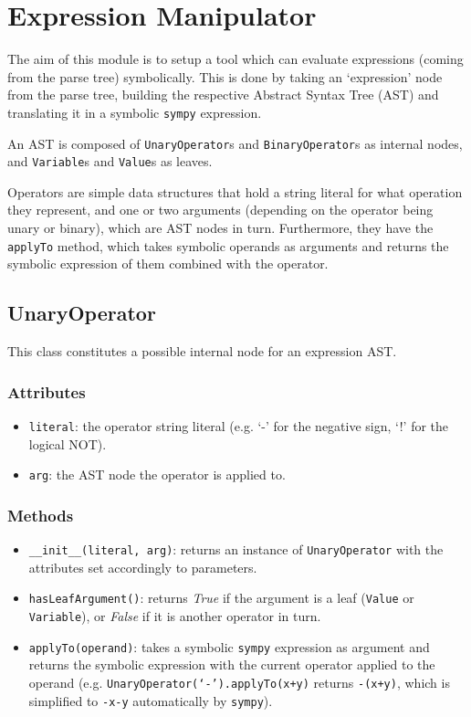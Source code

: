 \documentclass[12pt,a4paper]{report}
\theoremstyle{definition}
\theoremstyle{definition}
\theoremstyle{definition}
\begin{document}
\section{Expression Manipulator}
The aim of this module is to setup a tool which can evaluate expressions (coming from the parse tree) symbolically. This is done by taking an `expression' node from the parse tree, building the respective Abstract Syntax Tree (AST) and translating it in a symbolic \texttt{sympy} expression.

An AST is composed of \texttt{UnaryOperator}s and \texttt{BinaryOperator}s as internal nodes, and \texttt{Variable}s and \texttt{Value}s as leaves.

Operators are simple data structures that hold a string literal for what operation they represent, and one or two arguments (depending on the operator being unary or binary), which are AST nodes in turn. Furthermore, they have the \texttt{applyTo} method, which takes symbolic operands as arguments and returns the symbolic expression of them combined with the operator.
\subsection{UnaryOperator}
This class constitutes a possible internal node for an expression AST.
\subsubsection{Attributes}
\begin{itemize}
    \itemsep 0em
    \item \texttt{literal}: the operator string literal (e.g. `-' for the negative sign, `!' for the logical NOT).
    \item \texttt{arg}: the AST node the operator is applied to.
\end{itemize}
\subsubsection{Methods}
\begin{itemize}
    \itemsep 0em
    \item \texttt{\_\_init\_\_(literal, arg)}: returns an instance of \texttt{UnaryOperator} with the attributes set accordingly to parameters.
    \item \texttt{hasLeafArgument()}: returns \textit{True} if the argument is a leaf (\texttt{Value} or \texttt{Variable}), or \textit{False} if it is another operator in turn.
    \item \texttt{applyTo(operand)}: takes a symbolic \texttt{sympy} expression as argument and returns the symbolic expression with the current operator applied to the operand (e.g. \texttt{UnaryOperator(`-').applyTo(x+y)} returns \texttt{-(x+y)}, which is simplified to \texttt{-x-y} automatically by \texttt{sympy}).
\end{itemize}
\end{document}
